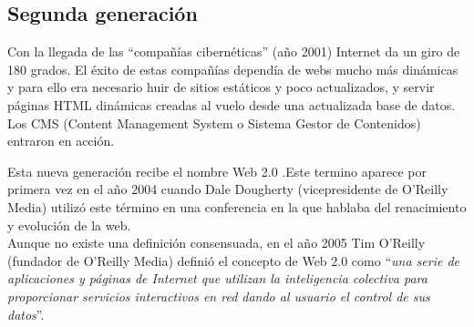 \subsection*{Segunda generación}
Con la llegada de las “compañías cibernéticas” (año 2001) Internet da un giro de 180 grados. El éxito de estas compañías dependía  de webs mucho más dinámicas y para ello era necesario huir de sitios estáticos y poco actualizados, y servir páginas HTML dinámicas creadas al vuelo desde una actualizada base de datos. Los CMS (Content Management System o Sistema Gestor de Contenidos) entraron en acción.

Esta nueva generación recibe el nombre Web 2.0 .Este termino aparece por primera vez en el año 2004 cuando Dale Dougherty (vicepresidente de O’Reilly Media) utilizó este término en una conferencia en la que hablaba del renacimiento y evolución de la web.
\\Aunque no existe una definición consensuada, en el año 2005 Tim O’Reilly (fundador de O’Reilly Media) definió el concepto de Web 2.0 como “\textit{una serie de aplicaciones y páginas de Internet que utilizan la inteligencia colectiva para proporcionar servicios interactivos en red dando al usuario el control de sus datos}”.

